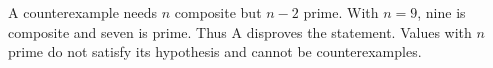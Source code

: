 A counterexample needs $n$ composite but $n-2$ prime. With $n=9$, nine is composite and seven is prime. Thus $\boxed{\text{A}}$ disproves the statement. Values with $n$ prime do not satisfy its hypothesis and cannot be counterexamples.
